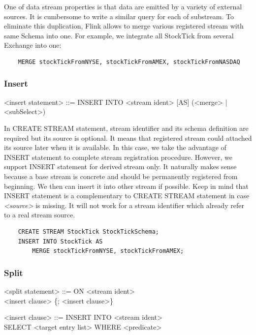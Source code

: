 One of data stream properties is that data are emitted by a variety of external sources. It is cumbersome to write a similar query for each of substream. To eliminate this duplication, Flink allows to merge various registered stream with same Schema into one. For example, we integrate all StockTick from several Exchange into one:
\begin{verbatim}
	MERGE stockTickFromNYSE, stockTickFromAMEX, stockTickFromNASDAQ
\end{verbatim}

\subsubsection{Insert}

\begin{grammar}
<insert statement> ::= INSERT INTO <stream ident> [AS] 
							(<merge> | <subSelect>)
\end{grammar}

In CREATE STREAM statement, stream identifier and its schema definition are required but its source is optional. It means that registered stream could attached its source later when it is available. In this case, we take the advantage of INSERT statement to complete stream registration procedure. However, we support INSERT statement for derived stream only. It naturally makes sense because a base stream is concrete and should be permanently registered from beginning. We then can insert it into other stream if possible.
Keep in mind that INSERT statement is a complementary to CREATE STREAM statement in case \textit{<source>} is missing. It will not work for a stream identifier which already refer to a real stream source.

\begin{verbatim}
	CREATE STREAM StockTick StockTickSchema;
	INSERT INTO StockTick AS 
		MERGE stockTickFromNYSE, stockTickFromAMEX;
\end{verbatim}


\subsubsection{Split}
\begin{grammar}
<split statement> ::= ON <stream ident> \\
						<insert clause> \{; <insert clause>\}
						
<insert clause> ::= INSERT INTO <stream ident> \\SELECT <target entry list> WHERE <predicate>
\end{grammar}

